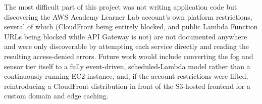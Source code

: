\documentclass[conference]{IEEEtran}
\begin{document}
The most difficult part of this project was not writing application code but discovering the AWS Academy Learner Lab account's own platform restrictions, several of which (CloudFront being entirely blocked, and public Lambda Function URLs being blocked while API Gateway is not) are not documented anywhere and were only discoverable by attempting each service directly and reading the resulting access-denied errors. Future work would include converting the fog and sensor tier itself to a fully event-driven, scheduled-Lambda model rather than a continuously running EC2 instance, and, if the account restrictions were lifted, reintroducing a CloudFront distribution in front of the S3-hosted frontend for a custom domain and edge caching.



\end{document}
